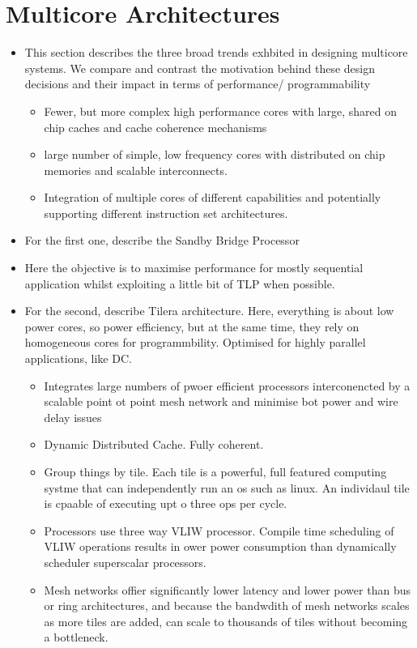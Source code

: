 \section{Multicore Architectures}
\begin{itemize}
\item This section describes the three broad trends exhbited in designing
multicore systems. We compare and contrast the motivation
behind these design decisions and their impact in terms of performance/
programmability  
\begin{itemize}
\item Fewer, but more complex high performance cores with large,
shared on chip caches and cache coherence mechanisms
\item large number of simple, low frequency cores with distributed on chip
memories and scalable interconnects.
\item Integration of multiple cores of different capabilities and 
potentially supporting different instruction set architectures. 
\end{itemize}
\item For the first one, describe the Sandby Bridge Processor
\item Here the objective is to maximise performance for mostly sequential application
whilst exploiting a little bit of TLP when possible. 
\item For the second, describe Tilera architecture. Here, everything is about
low power cores, so power efficiency, but at the same time, they rely on 
homogeneous cores for programmbility. Optimised for highly parallel
applications, like DC. 
\begin{itemize}
\item Integrates large numbers of pwoer efficient processors interconencted by a scalable 
point ot point mesh network and minimise bot power and wire  delay issues
\item Dynamic Distributed Cache. Fully coherent. 
\item Group things by tile. Each tile is a powerful, full featured computing systme 
that can independently run an os such as linux. 
An individaul tile is cpaable of executing upt o three ops per cycle. 
\item Processors use three way VLIW processor. Compile time scheduling of VLIW operations results in 
ower power consumption than dynamically scheduler superscalar processors. 
\item Mesh networks offier significantly lower latency and lower power than bus
or ring architectures, and because the bandwdith of mesh networks
scales as more tiles are added, can scale to thousands of tiles without 
becoming a bottleneck.


\end{itemize}
\end{itemize}
